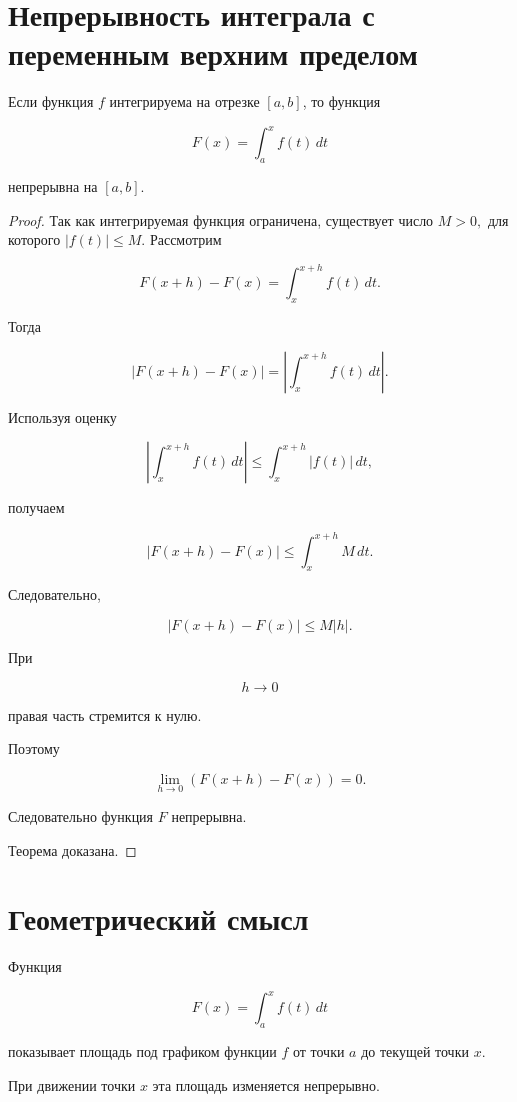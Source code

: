 \documentclass[14pt]{extreport}
\begin{document}
\section{Непрерывность интеграла с переменным верхним пределом}

\begin{theorem}
Если функция $f$ интегрируема на отрезке $[a,b]$,
то функция

\[
F(x)
=
\int_a^x f(t)\,dt
\]

непрерывна на $[a,b]$.
\end{theorem}

\begin{proof}

Так как интегрируемая функция ограничена,
существует число
$
M>0,
$
для которого
$
|f(t)|\le M.
$
\newpage
Рассмотрим

\[
F(x+h)-F(x)
=
\int_x^{x+h}f(t)\,dt.
\]

Тогда

\[
|F(x+h)-F(x)|
=
\left|
\int_x^{x+h}f(t)\,dt
\right|.
\]

Используя оценку

\[
\left|
\int_x^{x+h}f(t)\,dt
\right|
\le
\int_x^{x+h}|f(t)|\,dt,
\]

получаем

\[
|F(x+h)-F(x)|
\le
\int_x^{x+h}M\,dt.
\]

Следовательно,

\[
|F(x+h)-F(x)|
\le
M|h|.
\]

При

\[
h\to0
\]

правая часть стремится к нулю.

Поэтому

\[
\lim_{h\to0}
(F(x+h)-F(x))
=
0.
\]

Следовательно функция $F$ непрерывна.

Теорема доказана.
\end{proof}

\section{Геометрический смысл}

Функция

\[
F(x)=\int_a^x f(t)\,dt
\]

показывает площадь под графиком функции $f$
от точки $a$ до текущей точки $x$.

При движении точки $x$
эта площадь изменяется непрерывно.
\end{document}
